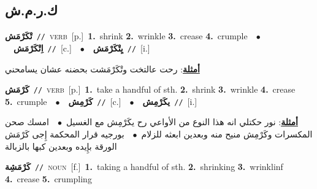 \documentclass[10pt,a4paper,twoside]{article} %
\begin{document}
\begin{multicols}{2}
\vspace{-3mm}
\subsection*{\color{blue}\foreignlanguage{arabic}{ك.ر.م.ش}\color{blue}{}} 

{\setlength\topsep{0pt}\textbf{\foreignlanguage{arabic}{تْكَرْمَش}}\ {\color{gray}\texttt{//}\color{black}}\ \textsc{verb}\ [p.]\ \textbf{1.}~shrink  \textbf{2.}~wrinkle  \textbf{3.}~crease  \textbf{4.}~crumple\ \ $\bullet$\ \ \setlength\topsep{0pt}\textbf{\foreignlanguage{arabic}{اِتْكَرْمَش}}\ {\color{gray}\texttt{//}\color{black}}\ [c.]\ \ $\bullet$\ \ \setlength\topsep{0pt}\textbf{\foreignlanguage{arabic}{يِتْكَرْمَش}}\ {\color{gray}\texttt{//}\color{black}}\ [i.]\  \begin{flushright}\color{gray}\foreignlanguage{arabic}{\textbf{\underline{\foreignlanguage{arabic}{أمثلة}}}: رحت عالتخت وتْكَرْمَشت بحضنه عشان يسامحني}\end{flushright}\color{black}} \vspace{2mm}

{\setlength\topsep{0pt}\textbf{\foreignlanguage{arabic}{كَرْمَش}}\ {\color{gray}\texttt{//}\color{black}}\ \textsc{verb}\ [p.]\ \textbf{1.}~take a handful of sth.  \textbf{2.}~shrink  \textbf{3.}~wrinkle  \textbf{4.}~crease  \textbf{5.}~crumple\ \ $\bullet$\ \ \setlength\topsep{0pt}\textbf{\foreignlanguage{arabic}{كَرْمِش}}\ {\color{gray}\texttt{//}\color{black}}\ [c.]\ \ $\bullet$\ \ \setlength\topsep{0pt}\textbf{\foreignlanguage{arabic}{يكَرْمِش}}\ {\color{gray}\texttt{//}\color{black}}\ [i.]\  \begin{flushright}\color{gray}\foreignlanguage{arabic}{\textbf{\underline{\foreignlanguage{arabic}{أمثلة}}}: نور حكتلي انه هذا النوع من الأواعي رح يكَرْمِش مع الغسيل\ $\bullet$\ \  امسك صحن المكسرات وكَرْمِش منيح منه وبعدين ابعثه للزلام\ $\bullet$\ \  بورجيه قرار المحكمة إِجى كَرْمَش الورقة بإِيده وبعدين كبها بالزبالة}\end{flushright}\color{black}} \vspace{2mm}

{\setlength\topsep{0pt}\textbf{\foreignlanguage{arabic}{كَرْمَشِة}}\ {\color{gray}\texttt{//}\color{black}}\ \textsc{noun}\ [f.]\ \textbf{1.}~taking a handful of sth.  \textbf{2.}~shrinking  \textbf{3.}~wrinklinf  \textbf{4.}~crease  \textbf{5.}~crumpling\ } \vspace{2mm}


\end{multicols}
\end{document}
